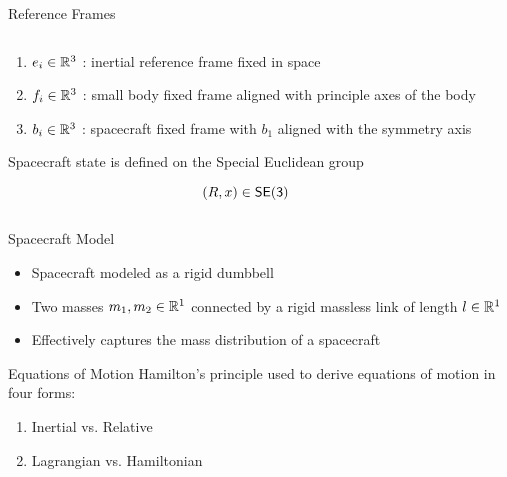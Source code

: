 \begin{frame}{Reference Frames}

    \begin{columns}
        \begin{column}{0.5\textwidth}
            \begin{enumerate}
                \item \( e_i \in \mathbb{R}^3 \) : inertial reference frame fixed in space
                \item \( f_i \in \mathbb{R}^3 \) : small body fixed frame aligned with principle axes of the body
                \item \( b_i \in \mathbb{R}^3 \) : spacecraft fixed frame with \( b_1 \) aligned with the symmetry axis
            \end{enumerate}
            
            \begin{block}{}
                Spacecraft state is defined on the Special Euclidean group

                \[ \left( R, x \right) \in \mathsf{SE(3)} \]
            \end{block}
        \end{column}
        \begin{column}{0.5\textwidth}
            \begin{scaletikzpicturetowidth}{2\columnwidth}
                \resizebox{\columnwidth}{!}{%
                
            }
            \end{scaletikzpicturetowidth}
        \end{column}
    \end{columns}
\end{frame}

\begin{frame}{Spacecraft Model}
    \begin{itemize}
        \item Spacecraft modeled as a rigid dumbbell
        \item Two masses \( m_1, m_2 \in \mathbb{R}^1 \) connected by a rigid massless link of length \( l \in \mathbb{R}^1\)
        \item Effectively captures the mass distribution of a spacecraft
    \end{itemize}

    \resizebox{\textwidth}{!}{%
        
    }
\end{frame}

\begin{frame}{Equations of Motion}
    Hamilton's principle used to derive equations of motion in four forms:
    \begin{enumerate}
        \item Inertial vs. Relative 
        \item Lagrangian vs. Hamiltonian
    \end{enumerate}
\end{frame}

